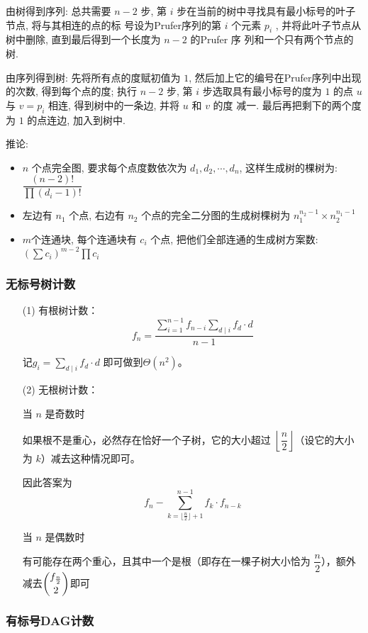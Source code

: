 \documentclass[twoside]{article}
\begin{document}
由树得到序列: 总共需要 $n - 2$ 步, 第 $i$ 步在当前的树中寻找具有最小标号的叶子节点, 将与其相连的点的标
号设为Prufer序列的第 $i$ 个元素 $p_i$ , 并将此叶子节点从树中删除, 直到最后得到一个长度为 $n - 2$ 的Prufer 序
列和一个只有两个节点的树.

由序列得到树: 先将所有点的度赋初值为 $1$, 然后加上它的编号在Prufer序列中出现的次数, 得到每个点的度;
执行 $n - 2$ 步, 第 $i$ 步选取具有最小标号的度为 $1$ 的点 $u$ 与 $v = p_i$ 相连, 得到树中的一条边, 并将 $u$ 和 $v$ 的度
减一. 最后再把剩下的两个度为 $1$ 的点连边, 加入到树中.

推论:

\begin{itemize}
    \item $n$ 个点完全图, 要求每个点度数依次为 $d_1, d_2 ,\cdots,d_n$, 这样生成树的棵树为: $\dfrac{(n-2)!}{\prod (d_i-1)!}$
    \item 左边有 $n_1$ 个点, 右边有 $n_2$ 个点的完全二分图的生成树棵树为 $n_1^{n_2-1}\times n_2^{n_1-1}$
    \item $m$个连通块, 每个连通块有 $c_i$ 个点, 把他们全部连通的生成树方案数: $(\sum c_i)^{m-2} \prod c_i$
\end{itemize}

\subsubsection{无标号树计数}
\begin{enumerate}
    \item[(1)]有根树计数： $$f_n = \dfrac{ \sum_{i=1}^{n-1} f_{n-i} \sum_{d \mid i} f_d \cdot d}{n-1}$$
    
    记$g_i = \sum_{d \mid i} f_d \cdot d$ 即可做到$\Theta(n^2)$。
    \item[(2)]无根树计数：
    
    当 $n$ 是奇数时

    如果根不是重心，必然存在恰好一个子树，它的大小超过 $\left\lfloor\dfrac n2\right\rfloor$（设它的大小为 $k$）减去这种情况即可。
    
    因此答案为
    $$f_n-\sum_{k=\lfloor\frac n2\rfloor+1}^{n-1}f_k\cdot f_{n-k}$$
    
    当 $n$ 是偶数时
    
    有可能存在两个重心，且其中一个是根（即存在一棵子树大小恰为 $\dfrac n2$），额外减去$\dbinom{f_{\frac n2}}2$即可
\end{enumerate}

\subsubsection{有标号DAG计数}
\end{document}
